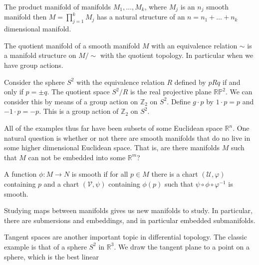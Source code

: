 \documentclass{article}                                                        %
\begin{document}
        \begin{definition}
            The product manifold of manifolds $M_{1},\hdots,M_{k}$, where
            $M_{j}$ is an $n_{j}$ smooth manifold then
            $M=\prod_{j=1}^{k}M_{j}$ has a natural structure of an
            $n=n_{1}+\dots+n_{k}$ dimensional manifold.
        \end{definition}
        \begin{definition}
            The quotient manifold of a smooth manifold $M$ with an equivalence
            relation $\sim$ is a manifold structure on $M/\sim$ with the
            quotient topology. In particular when we have group actions.
        \end{definition}
        \begin{example}
            Consider the sphere $S^{2}$ with the equivalence relation $R$
            defined by $pRq$ if and only if $p=\pm{q}$. The quotient space
            $S^{2}/R$ is the real projective plane $\mathbb{RP}^{2}$. We can
            consider this by means of a group action on $\mathbb{Z}_{2}$ on
            $S^{2}$. Define $g\cdot{p}$ by $1\cdot{p}=p$ and
            $\minus{1}\cdot{p}=\minus{p}$. This is a group action of
            $\mathbb{Z}_{2}$ on $S^{2}$.
        \end{example}
        All of the examples thus far have been subsets of some Euclidean space
        $\mathbb{R}^{n}$. One natural question is whether or not there are
        smooth manifolds that do no live in some higher dimensional Euclidean
        space. That is, are there manifolds $M$ such that $M$ can not be
        embedded into some $\mathbb{R}^{m}$?
        \begin{definition}
            A function $\phi:M\rightarrow{N}$ is smooth if for all $p\in{M}$
            there is a chart $(\mathcal{U},\varphi)$ containing $p$ and a
            chart $(\mathcal{V},\psi)$ containing $\phi(p)$ such that
            $\psi\circ\phi\circ\varphi^{\minus{1}}$ is smooth.
        \end{definition}
        Studying maps between manifolds gives us new manifolds to study. In
        particular, there are submersions and embeddings, and in particular
        embedded submanifolds.
        \par\hfill\par
        Tangent spaces are another important topic in differential topology. The
        classic example is that of a sphere $S^{2}$ in $\mathbb{R}^{3}$. We draw
        the tangent plane to a point on a sphere, which is the best linear
\end{document}
